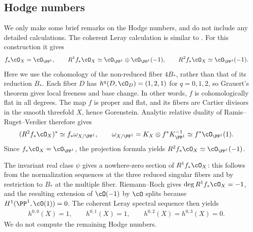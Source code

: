 \subsection{Hodge numbers}
We only make some brief remarks on the Hodge numbers, and do not include any detailed calculations. 
The coherent Leray calculation is similar to
\cite[Proposition~9.13]{AC}. For this construction it gives
\begin{align}\label{direct}
 f_*\cO_X=\cO_{\PP^1},\qquad
 R^1f_*\cO_X\simeq\cO_{\PP^1}\oplus\cO_{\PP^1}(-1),\qquad
 R^2f_*\cO_X\simeq\cO_{\PP^1}(-1).
\end{align}
Here we use the cohomology of the non-reduced fiber $4B_*$, rather
than that of its reduction $B_*$.
Each fiber $D$ has
$h^q(D,\cO_D)=(1,2,1)$ for $q=0,1,2$, so Grauert's theorem gives
local freeness and base change. In other words, $f$ is cohomologically
flat in all degrees. The map $f$ is proper and flat, and its fibers
are Cartier divisors in the smooth threefold $X$, hence Gorenstein.
Analytic relative duality of Ramis--Ruget--Verdier \cite{RRV} therefore
gives
\begin{align*}
 (R^2f_*\cO_X)^*\simeq f_*\omega_{X/\PP^1},\qquad
 \omega_{X/\PP^1}=K_X\otimes f^*K_{\PP^1}^{-1}
 \simeq f^*\cO_{\PP^1}(1).
\end{align*}
Since $f_*\cO_X=\cO_{\PP^1}$, the projection formula yields
$R^2f_*\cO_X\simeq\cO_{\PP^1}(-1)$.

The invariant real class $\psi$ gives a
nowhere-zero section of $R^1f_*\cO_X$: this follows from the
normalization sequences at the three reduced singular fibers and by
restriction to $B_*$ at the multiple fiber. Riemann--Roch gives
$\deg R^1f_*\cO_X=-1$, and the resulting extension of $\cO(-1)$ by
$\cO$ splits because $H^1(\PP^1,\cO(1))=0$.
The coherent Leray spectral sequence then yields
\begin{align}\label{hodge}
 h^{0,0}(X)=1,\qquad h^{0,1}(X)=1,\qquad
 h^{0,2}(X)=h^{0,3}(X)=0.
\end{align}
We do not compute the remaining Hodge numbers.

